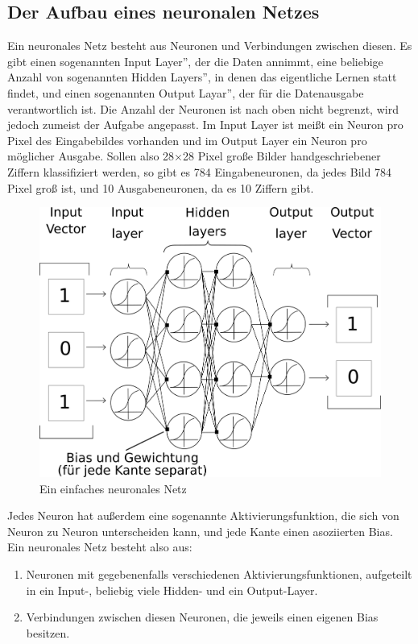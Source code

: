 \documentclass{article}
\begin{document}
\subsection{Der Aufbau eines neuronalen Netzes}
Ein neuronales Netz besteht aus Neuronen und Verbindungen zwischen diesen. Es gibt einen sogenannten \glqq Input Layer'', der die Daten annimmt, eine beliebige Anzahl von sogenannten \glqq Hidden Layers'', in denen das eigentliche Lernen statt findet, und einen sogenannten \glqq Output Layar'', der für die Datenausgabe verantwortlich ist. Die Anzahl der Neuronen ist nach oben nicht begrenzt, wird jedoch zumeist der Aufgabe angepasst. Im Input Layer ist meißt ein Neuron pro Pixel des Eingabebildes vorhanden und im Output Layer ein Neuron pro möglicher Ausgabe. Sollen also 28$\times$28 Pixel große Bilder handgeschriebener Ziffern klassifiziert werden, so gibt es 784 Eingabeneuronen, da jedes Bild 784 Pixel groß ist, und 10 Ausgabeneuronen, da es 10 Ziffern gibt.
\begin{figure}[h]
\centering
\includegraphics[width=\linewidth]{../graphics/Neural_Net.png}
\caption{Ein einfaches neuronales Netz}
\end{figure}
Jedes Neuron hat außerdem eine sogenannte Aktivierungsfunktion, die sich von Neuron zu Neuron unterscheiden kann, und jede Kante einen asoziierten Bias. Ein neuronales Netz besteht also aus:\newline
\begin{enumerate}
	\item Neuronen mit gegebenenfalls verschiedenen Aktivierungsfunktionen, aufgeteilt in ein Input-, beliebig viele Hidden- und ein Output-Layer.
	\item Verbindungen zwischen diesen Neuronen, die jeweils einen eigenen Bias besitzen.
\end{enumerate}
\end{document}
